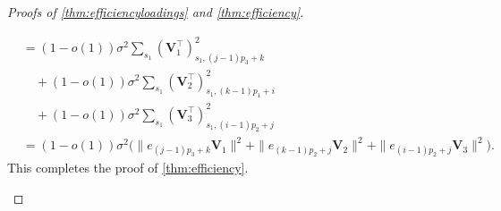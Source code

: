 \documentclass[10pt]{article}
\newcommand{\0}{{\mathbf{0}}}
\newcommand{\1}{{\mathbf{1}}}
\renewcommand{\t}{^{\top}}
\renewcommand{\hat}{\widehat}
\renewcommand{\hat}{\widehat}
\begin{document}
\begin{proof}[Proofs of \cref{thm:efficiencyloadings} and \cref{thm:efficiency}]
\begin{itemize}
\begin{align*}
    &= (1- o(1))\sigma^2\sum_{s_1} ( \mathbf{V}_1\t )_{s_1,(j-1)p_3 + k}^2 \\
    &\quad + (1- o(1))\sigma^2\sum_{s_1} ( \mathbf{V}_2\t )_{s_1,(k-1)p_1 + i}^2 \\
    &\quad + (1- o(1))\sigma^2\sum_{s_1} ( \mathbf{V}_3\t )_{s_1,(i-1)p_2 + j}^2 \\ 
    &=(1- o(1))\sigma^2 \bigg( \| e_{(j-1)p_3 + k} \mathbf{V}_1 \|^2 + \| e_{(k-1)p_2 + j} \mathbf{V}_2 \|^2 + \| e_{(i-1)p_2 + j} \mathbf{V}_3 \|^2\bigg).
\end{align*}
This completes the proof of \cref{thm:efficiency}.
\end{itemize}
\end{proof}


\end{document}
